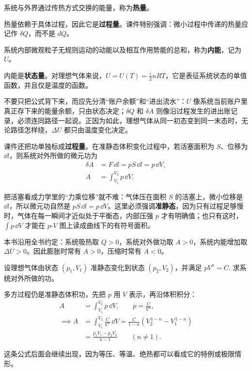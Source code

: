 \documentclass[lang=cn,11pt]{elegantbook}
\newcommand{\bridge}[1]{\begin{note}#1\end{note}}
\begin{document}
\begin{definition}[热量]\label{def:heat}
系统与外界通过传热方式交换的能量，称为\textbf{热量}。
\end{definition}

热量依赖于具体过程，因此它是\textbf{过程量}。课件特别强调：微小过程中传递的热量应记作 \(\delta Q\)，而不是 \(dQ\)。

\begin{definition}[内能]\label{def:internal-energy}
系统内部微观粒子无规则运动的动能以及相互作用势能的总和，称为\textbf{内能}，记为 \(U\)。
\end{definition}

内能是\textbf{状态量}。对理想气体来说，\(U=U(T)=\frac{i}{2}nRT\)，它是表征系统状态的单值函数，并且仅是温度的函数。

\begin{note}
不要只把公式背下来，而应先分清“账户余额”和“进出流水”：\(U\) 像系统当前账户里真正存下来的能量余额，只由状态决定；\(\delta Q\) 和 \(\delta A\) 则像沿过程发生的进出账记录，必须连同路径一起说。正因为如此，理想气体从同一初态变到同一末态时，无论路径怎样绕，\(\Delta U\) 都只由温度变化决定。
\end{note}

课件还把功单独标成\textbf{过程量}。在准静态体积变化过程中，若活塞面积为 \(S\)、位移为 \(\dd l\)，则系统对外所做的微元功为
\[
\begin{aligned}
\delta A&=F\,\dd l=pS\,\dd l=p\,\dd V,\\
A&=\int_{V_1}^{V_2}p\,\dd V.
\end{aligned}
\]

\bridge{把活塞看成力学里的“力乘位移”就不难：气体压在面积 \(S\) 的活塞上，微小位移是 \(\dd l\)，所以微元功自然是 \(pS\,\dd l=p\,\dd V\)。这里必须强调\textbf{准静态}，因为只有过程足够慢时，气体在每一瞬间才近似处于平衡态，内部压强 \(p\) 才有明确值；也只有这时，\(\int p\,\dd V\) 才能在 \(p\)-\(V\) 图上读成曲线下的有符号面积。}

\begin{remark}
本书沿用全书约定：系统吸热取 \(Q>0\)，系统对外做功取 \(A>0\)，系统内能增加取 \(\Delta U>0\)。因此膨胀时常有 \(A>0\)，压缩时常有 \(A<0\)。
\end{remark}

\begin{exercise}[多方关系下的准静态体积功]
设理想气体由状态 \((p_1,V_1)\) 准静态变化到状态 \((p_2,V_2)\)，并满足
 \(pV^n=C.\) 
求系统对外所做的功。
\end{exercise}

\begin{solution}
多方过程仍是准静态体积功，先把 \(p\) 用 \(V\) 表示，再沿体积积分：
\[
\begin{aligned}
A&=\int_{V_1}^{V_2}p\,\dd V,\qquad p=\frac{C}{V^n},\\
\implies A&=\int_{V_1}^{V_2}\frac{C}{V^n}\,\dd V
=\frac{C}{1-n}\left(V_2^{\,1-n}-V_1^{\,1-n}\right)\\
&=\frac{p_1V_1-p_2V_2}{n-1}\qquad (n\neq1).
\end{aligned}
\]

这条公式后面会继续出现，因为等压、等温、绝热都可以看成它的特例或极限情形。
\end{solution}
\end{document}
